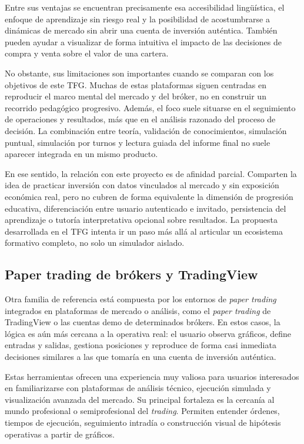Entre sus ventajas se encuentran precisamente esa accesibilidad lingüística, el enfoque de aprendizaje sin riesgo real y la posibilidad de acostumbrarse a dinámicas de mercado sin abrir una cuenta de inversión auténtica. También pueden ayudar a visualizar de forma intuitiva el impacto de las decisiones de compra y venta sobre el valor de una cartera.

No obstante, sus limitaciones son importantes cuando se comparan con los objetivos de este TFG. Muchas de estas plataformas siguen centradas en reproducir el marco mental del mercado y del bróker, no en construir un recorrido pedagógico progresivo. Además, el foco suele situarse en el seguimiento de operaciones y resultados, más que en el análisis razonado del proceso de decisión. La combinación entre teoría, validación de conocimientos, simulación puntual, simulación por turnos y lectura guiada del informe final no suele aparecer integrada en un mismo producto.

En ese sentido, la relación con este proyecto es de afinidad parcial. Comparten la idea de practicar inversión con datos vinculados al mercado y sin exposición económica real, pero no cubren de forma equivalente la dimensión de progresión educativa, diferenciación entre usuario autenticado e invitado, persistencia del aprendizaje o tutoría interpretativa opcional sobre resultados. La propuesta desarrollada en el TFG intenta ir un paso más allá al articular un ecosistema formativo completo, no solo un simulador aislado.

\subsection{Paper trading de brókers y TradingView}

Otra familia de referencia está compuesta por los entornos de \textit{paper trading} integrados en plataformas de mercado o análisis, como el \textit{paper trading} de TradingView \cite{tradingview_paper} o las cuentas demo de determinados brókers. En estos casos, la lógica es aún más cercana a la operativa real: el usuario observa gráficos, define entradas y salidas, gestiona posiciones y reproduce de forma casi inmediata decisiones similares a las que tomaría en una cuenta de inversión auténtica.

Estas herramientas ofrecen una experiencia muy valiosa para usuarios interesados en familiarizarse con plataformas de análisis técnico, ejecución simulada y visualización avanzada del mercado. Su principal fortaleza es la cercanía al mundo profesional o semiprofesional del \textit{trading}. Permiten entender órdenes, tiempos de ejecución, seguimiento intradía o construcción visual de hipótesis operativas a partir de gráficos.

